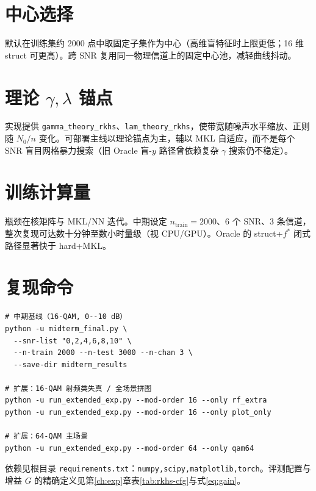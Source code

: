 \section{中心选择}

默认在训练集约 2000 点中取固定子集作为中心（高维盲特征时上限更低；16 维 struct 可更高）。跨 SNR 复用同一物理信道上的固定中心池，减轻曲线抖动。

\section{理论 $\gamma,\lambda$ 锚点}

实现提供 \texttt{gamma\_theory\_rkhs}、\texttt{lam\_theory\_rkhs}，使带宽随噪声水平缩放、正则随 $N_0/n$ 变化。可部署主线以理论锚点为主，辅以 MKL 自适应，而不是每个 SNR 盲目网格暴力搜索（旧 Oracle 盲-$y$ 路径曾依赖复杂 $\gamma$ 搜索仍不稳定）。

\section{训练计算量}

瓶颈在核矩阵与 MKL/NN 迭代。中期设定 $n_{\mathrm{train}}=2000$、$6$ 个 SNR、$3$ 条信道，整次复现可达数十分钟至数小时量级（视 CPU/GPU）。Oracle 的 struct+$f^*$ 闭式路径显著快于 hard+MKL。

\section{复现命令}

\begin{verbatim}
# 中期基线（16-QAM, 0--10 dB）
python -u midterm_final.py \
  --snr-list "0,2,4,6,8,10" \
  --n-train 2000 --n-test 3000 --n-chan 3 \
  --save-dir midterm_results

# 扩展：16-QAM 射频类失真 / 全场景拼图
python -u run_extended_exp.py --mod-order 16 --only rf_extra
python -u run_extended_exp.py --mod-order 16 --only plot_only

# 扩展：64-QAM 主场景
python -u run_extended_exp.py --mod-order 64 --only qam64
\end{verbatim}
依赖见根目录 \texttt{requirements.txt}：\texttt{numpy,scipy,matplotlib,torch}。评测配置与增益 $G$ 的精确定义见第\ref{ch:exp}章表\ref{tab:rkhs-cfg}与式\eqref{eq:gain}。
